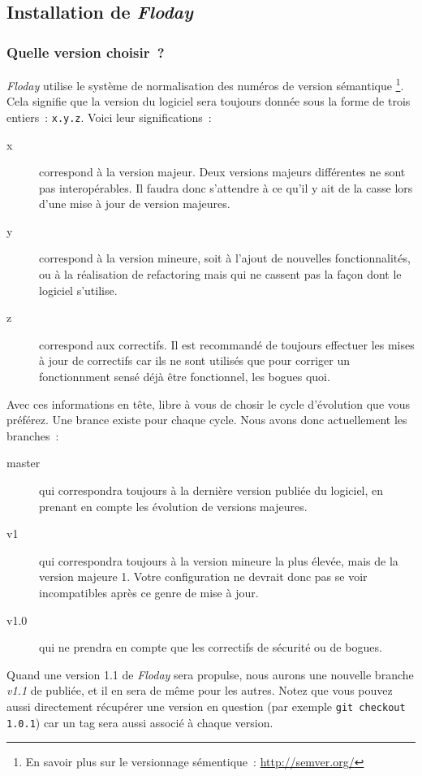 \subsection{Installation de \emph{Floday}}

\subsubsection{Quelle version choisir~?}

\emph{Floday} utilise le système de normalisation des numéros de version sémantique%
\footnote{En savoir plus sur le versionnage sémentique~: \url{http://semver.org/}}.
Cela signifie que la version du logiciel sera toujours donnée sous la forme de trois entiers~: {\tt{}x.y.z}.
Voici leur significations~:

\begin{description}
	\item[x] correspond à la version majeur. Deux versions majeurs différentes ne sont pas interopérables.
Il faudra donc s'attendre à ce qu'il y ait de la casse lors d'une mise à jour de version majeures.
	\item[y] correspond à la version mineure, soit à l'ajout de nouvelles fonctionnalités, ou à la réalisation de refactoring mais qui ne cassent pas la façon dont le logiciel s'utilise.
	\item[z] correspond aux correctifs. Il est recommandé de toujours effectuer les mises à jour de correctifs car ils ne sont utilisés que pour corriger un fonctionnment sensé déjà être fonctionnel, les bogues quoi.
\end{description}

Avec ces informations en tête, libre à vous de chosir le cycle d'évolution que vous préférez. Une brance existe pour chaque cycle. Nous avons donc actuellement les branches~:
\begin{description}
	\item[master] qui correspondra toujours à la dernière version publiée du logiciel, en prenant en compte les évolution de versions majeures.
	\item[v1] qui correspondra toujours à la version mineure la plus élevée, mais de la version majeure 1. Votre configuration ne devrait donc pas se voir incompatibles après ce genre de mise à jour.
	\item[v1.0] qui ne prendra en compte que les correctifs de sécurité ou de bogues.
\end{description}

Quand une version 1.1 de \emph{Floday} sera \gls{propulse}, nous aurons une nouvelle branche \emph{v1.1} de publiée, et il en sera de même pour les autres.
Notez que vous pouvez aussi directement récupérer une version en question (par exemple {\tt git checkout 1.0.1}) car un tag sera aussi associé à chaque version.

